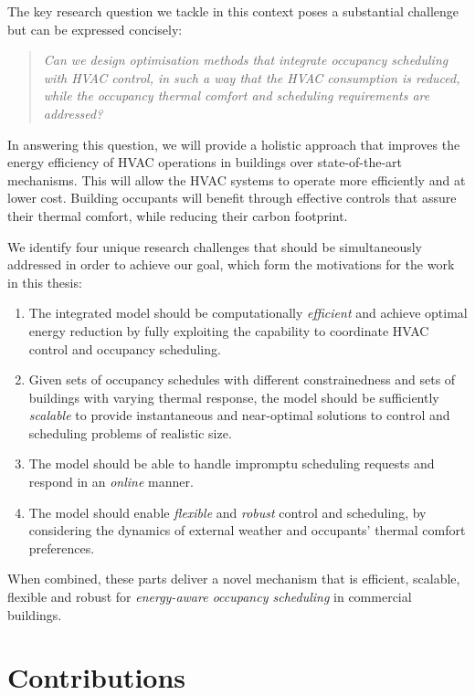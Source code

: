 The key research question we tackle in this context poses a substantial challenge but can be expressed concisely:
\begin{quotation}
		\emph{Can we design optimisation methods that integrate occupancy scheduling with HVAC control, in such a way that the HVAC consumption is reduced, while the occupancy thermal comfort and scheduling requirements are addressed?}
\end{quotation}

In answering this question, we will provide a holistic approach that improves the energy efficiency of HVAC operations in buildings over state-of-the-art mechanisms. This will allow the HVAC systems to operate more efficiently and at lower cost. Building occupants will benefit through effective controls that assure their thermal comfort, while reducing their carbon footprint.

We identify four unique research challenges that should be simultaneously addressed in order to achieve our goal, which form the motivations for the work in this thesis:
\begin{enumerate}
  \item The integrated model should be computationally \emph{efficient} and achieve optimal energy reduction by fully exploiting the capability to coordinate HVAC control and occupancy scheduling. 
	\item Given sets of occupancy schedules with different constrainedness and sets of buildings with varying thermal response, the model should be sufficiently \emph{scalable} to provide instantaneous and near-optimal solutions to control and scheduling problems of realistic size.
	\item The model should be able to handle impromptu scheduling requests and respond in an \emph{online} manner.
	\item The model should enable \emph{flexible} and \emph{robust} control and scheduling, by considering the dynamics of external weather and occupants' thermal comfort preferences. 
\end{enumerate}

When combined, these parts deliver a novel mechanism that is efficient, scalable, flexible and robust for \emph{energy-aware occupancy scheduling} in commercial buildings.


\section{Contributions}
\label{sec:contributions}

